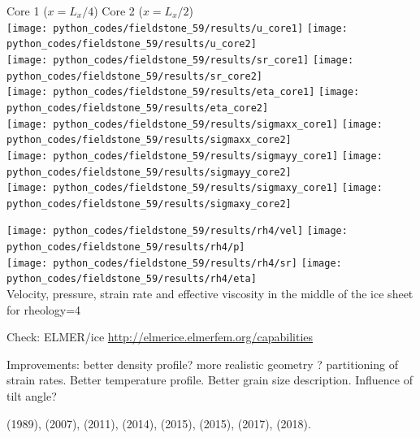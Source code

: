 \begin{center}
Core 1 ($x=L_x/4$) \hspace{5cm}  Core 2 ($x=L_x/2$)  \\
\texttt{[image: python\_codes/fieldstone\_59/results/u\_core1]}
\texttt{[image: python\_codes/fieldstone\_59/results/u\_core2]}\\
\texttt{[image: python\_codes/fieldstone\_59/results/sr\_core1]}
\texttt{[image: python\_codes/fieldstone\_59/results/sr\_core2]}\\
\texttt{[image: python\_codes/fieldstone\_59/results/eta\_core1]}
\texttt{[image: python\_codes/fieldstone\_59/results/eta\_core2]}\\
\texttt{[image: python\_codes/fieldstone\_59/results/sigmaxx\_core1]}
\texttt{[image: python\_codes/fieldstone\_59/results/sigmaxx\_core2]}\\
\texttt{[image: python\_codes/fieldstone\_59/results/sigmayy\_core1]}
\texttt{[image: python\_codes/fieldstone\_59/results/sigmayy\_core2]}\\
\texttt{[image: python\_codes/fieldstone\_59/results/sigmaxy\_core1]}
\texttt{[image: python\_codes/fieldstone\_59/results/sigmaxy\_core2]}
\end{center}


\begin{center}
\texttt{[image: python\_codes/fieldstone\_59/results/rh4/vel]}
\texttt{[image: python\_codes/fieldstone\_59/results/rh4/p]}\\
\texttt{[image: python\_codes/fieldstone\_59/results/rh4/sr]}
\texttt{[image: python\_codes/fieldstone\_59/results/rh4/eta]}\\
{\captionfont Velocity, pressure, strain rate and effective viscosity in the middle of the ice sheet
for rheology=4}
\end{center}



Check: ELMER/ice \url{http://elmerice.elmerfem.org/capabilities}

Improvements: better density profile? more realistic geometry ? 
partitioning of strain rates. Better temperature profile. 
Better grain size description. Influence of tilt angle? 

\vspace{1cm}

\Literature 
\textcite{buja89} (1989),
\textcite{zwgg07} (2007),
\textcite{zhjg11} (2011),
\textcite{lejx14} (2014),
\textcite{issg15} (2015),
\textcite{yash15} (2015),
\textcite{gors17} (2017),
\textcite{heah18} (2018).


